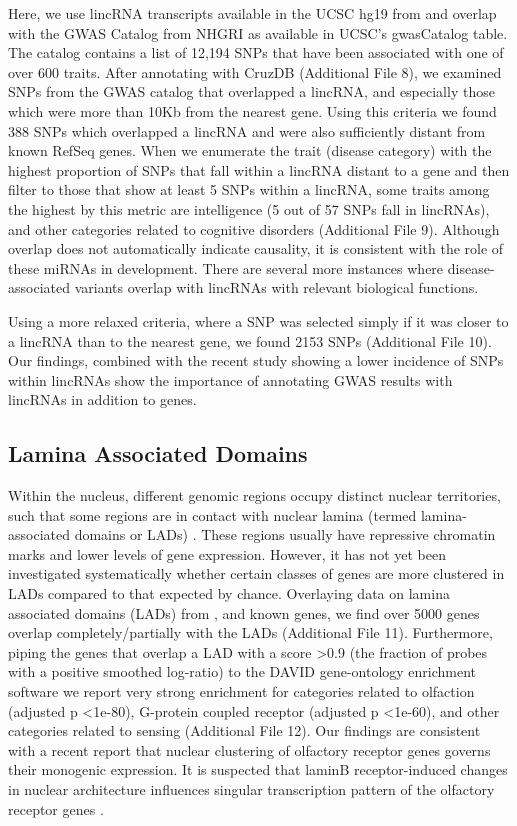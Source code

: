 \documentclass[10pt]{bmc_article}
\newenvironment{bmcformat}{\baselineskip20pt\sloppy\setboolean{publ}{false}}{\baselineskip20pt\sloppy}
\begin{document}
\begin{bmcformat}
Here, we use lincRNA transcripts available in the UCSC hg19 from \cite{Cabili} and overlap  with the GWAS Catalog from NHGRI \cite{Hindorff} as available in UCSC's gwasCatalog table. The catalog contains a list of 12,194 SNPs that have been associated with one of over 600 traits. After annotating with CruzDB (Additional File 8), we examined SNPs from the GWAS catalog that overlapped a lincRNA, and especially those which were more than 10Kb from the nearest gene. Using this criteria we found 388 SNPs which overlapped a lincRNA and were also sufficiently distant from known RefSeq genes. When we enumerate the trait (disease category) with the highest proportion of SNPs that fall within a lincRNA distant to a gene and then filter to those that show at least 5 SNPs within a lincRNA, some traits among the highest by this metric are intelligence (5 out of 57 SNPs fall in lincRNAs), and other categories related to cognitive disorders (Additional File 9). Although overlap does not automatically indicate causality, it is consistent with the role of these miRNAs in development. There are several more instances where disease-associated variants overlap with lincRNAs with relevant biological functions. 

Using a more relaxed criteria, where a SNP was selected simply if it was closer to a lincRNA than to the nearest gene, we found 2153 SNPs (Additional File 10). Our findings, combined with the recent study showing a lower incidence of SNPs within lincRNAs \cite{Chen} show the importance of annotating GWAS results with lincRNAs in addition to genes.

\subsection*{Lamina Associated Domains}
Within the nucleus, different genomic regions occupy distinct nuclear territories, such that some regions are in contact with nuclear lamina (termed lamina-associated domains or LADs) \cite{Guelen,Dittmer}. These regions usually have repressive chromatin marks and lower levels of gene expression. However, it has not yet been investigated systematically whether certain classes of genes are more clustered in LADs compared to that expected by chance. Overlaying data on lamina associated domains (LADs) from \cite{Guelen}, and known genes, we find over 5000 genes overlap completely/partially with the LADs (Additional File 11). Furthermore, piping the genes that overlap a LAD with a score \textgreater 0.9 (the fraction of probes with a positive smoothed log-ratio) to the DAVID gene-ontology enrichment software \cite{Huang} we report very strong enrichment for categories related to olfaction (adjusted p \textless 1e-80), G-protein coupled receptor (adjusted p \textless 1e-60), and other categories related to sensing (Additional File 12).  Our findings are consistent with a recent report \cite{Clowney} that nuclear clustering of olfactory receptor genes governs their monogenic expression. It is suspected that laminB receptor-induced changes in nuclear architecture influences singular transcription pattern of the olfactory receptor genes \cite{Clowney}.


\end{bmcformat}
\end{document}
